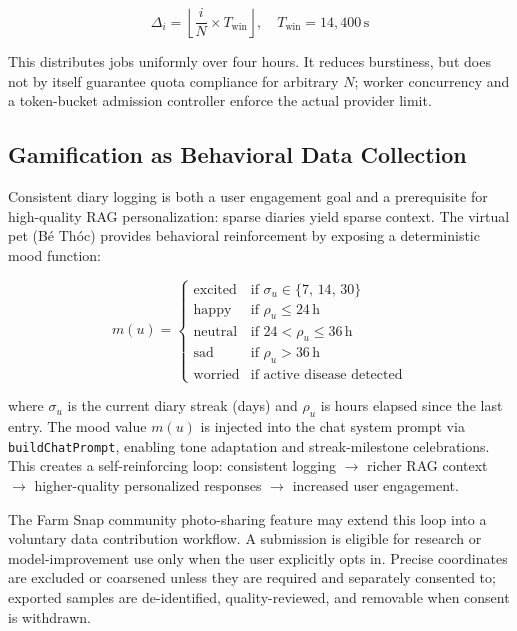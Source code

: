 \documentclass[conference]{IEEEtran}
\begin{document}
\begin{equation}
  \Delta_i = \!\left\lfloor \frac{i}{N}
    \times T_{\mathrm{win}} \right\rfloor, \quad
  T_{\mathrm{win}} = 14{,}400\,\mathrm{s}
  \label{eq:delay}
\end{equation}

This distributes jobs uniformly over four hours. It reduces burstiness, but does not by itself guarantee quota compliance for arbitrary $N$; worker concurrency and a token-bucket admission controller enforce the actual provider limit.

\subsection{Gamification as Behavioral Data Collection}

Consistent diary logging is both a user engagement goal and a
prerequisite for high-quality RAG personalization: sparse diaries
yield sparse context. The virtual pet (B\'{e} Th\'{o}c) provides
behavioral reinforcement by exposing a deterministic mood function:

\begin{equation}
  m(u) =
  \begin{cases}
    \text{excited} & \text{if } \sigma_u \in \{7,\,14,\,30\} \\[2pt]
    \text{happy}   & \text{if } \rho_u \le 24\,\mathrm{h} \\[2pt]
    \text{neutral} & \text{if } 24 < \rho_u \le 36\,\mathrm{h} \\[2pt]
    \text{sad}     & \text{if } \rho_u > 36\,\mathrm{h} \\[2pt]
    \text{worried} & \text{if active disease detected}
  \end{cases}
  \label{eq:mood}
\end{equation}

\noindent where $\sigma_u$ is the current diary streak (days) and
$\rho_u$ is hours elapsed since the last entry. The mood value
$m(u)$ is injected into the chat system prompt via
\texttt{buildChatPrompt}, enabling tone adaptation and
streak-milestone celebrations. This creates a self-reinforcing loop:
consistent logging $\to$ richer RAG context $\to$ higher-quality
personalized responses $\to$ increased user engagement.

The Farm Snap community photo-sharing feature may extend this loop into a voluntary data contribution workflow. A submission is eligible for research or model-improvement use only when the user explicitly opts in. Precise coordinates are excluded or coarsened unless they are required and separately consented to; exported samples are de-identified, quality-reviewed, and removable when consent is withdrawn.
\end{document}
